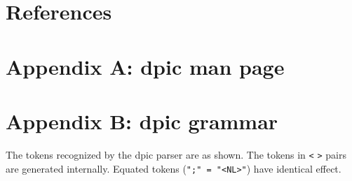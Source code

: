 \documentclass[11pt]{article}
\begin{document}
\section{References}

\renewcommand{\refname}{\vspace*{-\baselineskip}}


\clearpage
\section{Appendix A: dpic man page}\label{Appendix A:}


\clearpage
\section{Appendix B: dpic grammar}\label{Appendix B:}
The tokens recognized by the dpic parser are as shown.  The tokens
in {\tt <} {\tt >} pairs are generated internally.  Equated tokens
({\tt ";" = "<NL>"}) have identical effect.
\end{document}
